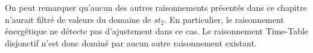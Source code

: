 On peut remarquer qu'aucun des autres raisonnements présentés dans ce
chapitre n'aurait filtré de valeurs du domaine de $st_2$. En
particulier, le raisonnement énergétique  ne détecte
pas d'ajustement dans ce cas. Le raisonnement Time-Table disjonctif
n'est donc dominé par aucun autre raisonnement existant. 




